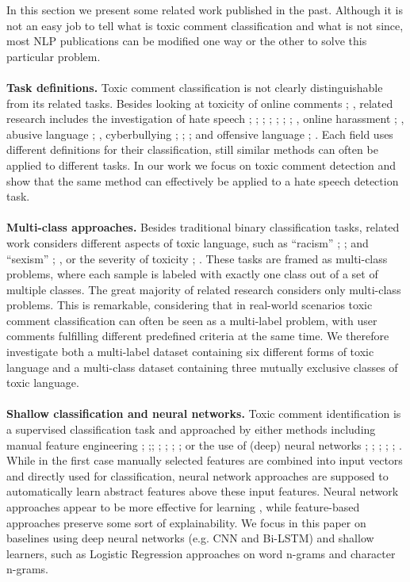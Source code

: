 \documentclass[10pt,twocolumn,letterpaper]{article}
\begin{document}
In this section we present some related work published in the past. Although it is not an easy job to tell what is toxic comment classification and what is not since, most NLP publications can be modified one way or the other to solve this particular problem.\\\\
\textbf{Task definitions.} Toxic comment classification is not clearly distinguishable from its related tasks. Besides looking at toxicity of online comments \cite{r04}; \cite{r05}, related research includes the investigation of hate speech \cite{r02}; \cite{r06}; \cite{r07}; \cite{r08}; \cite{r09}; \cite{r10}; \cite{r11}; \cite{r12}, online harassment \cite{r13}; \cite{r14}, abusive language \cite{r15}; \cite{r16}, cyberbullying \cite{r17}; \cite{r18}; \cite{r19}; \cite{r20} and offensive language \cite{r21}; \cite{r22}. Each field uses different definitions for their classification, still similar methods can often be applied to different tasks. In our work we focus on toxic comment detection and show that the same method can effectively be applied to a hate speech detection task.\\\\
\textbf{Multi-class approaches.} Besides traditional binary classification tasks, related work considers different aspects of toxic language, such as “racism” \cite{r23}; \cite{r24}; \cite{r25} and “sexism” \cite{r26}; \cite{r27}, or the severity of toxicity \cite{r07}; \cite{r28}. These tasks are framed as multi-class problems, where each sample is labeled with exactly one class out of a set of multiple classes. The great majority of related research considers only multi-class problems. This is remarkable, considering that in real-world scenarios toxic comment classification
can often be seen as a multi-label problem, with user comments fulfilling different predefined criteria at the same time. We therefore investigate both a multi-label dataset containing six different forms of toxic language and a multi-class dataset containing three mutually exclusive classes of toxic language.\\\\
\textbf{Shallow classification and neural networks.} Toxic comment identification is a supervised classification task and approached by either methods including manual feature engineering \cite{r06}; \cite{r15};\cite{r24}; \cite{r07}; \cite{r29}; \cite{r30}; \cite{r31}; \cite{r32} or the use of (deep) neural networks \cite{r33}; \cite{r01}; \cite{r02}; \cite{r11}; \cite{r16}; \cite{r08}. While in the first case manually selected features are combined into input vectors and directly used for classification, neural network approaches are supposed to automatically learn abstract features above these input features. Neural network approaches appear to be more effective for learning \cite{r06}, while feature-based approaches preserve some sort of explainability. We focus in this paper on baselines using deep neural networks (e.g. CNN and Bi-LSTM) and shallow learners, such as Logistic Regression approaches on word n-grams and character n-grams.\\\\
\end{document}
